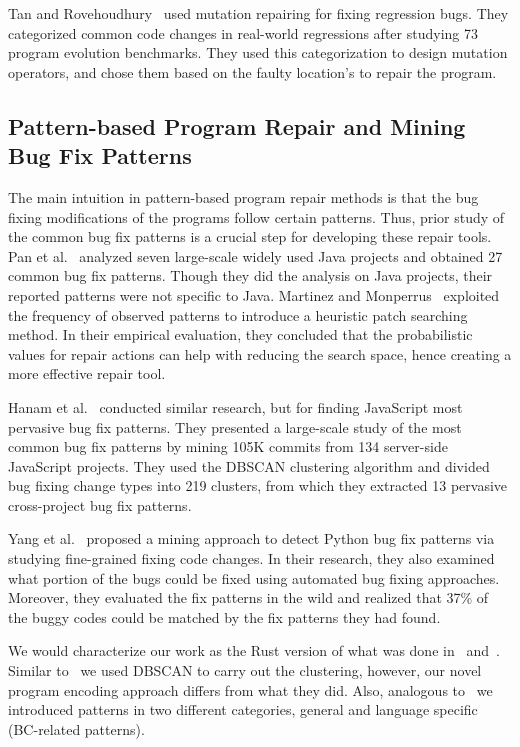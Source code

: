 Tan and Rovehoudhury~\cite{tan2015relifix} used mutation repairing for fixing regression bugs. They categorized common code changes in real-world regressions after studying 73 program evolution benchmarks. They used this categorization to design mutation operators, and chose them based on the faulty location’s to repair the program.

\subsection{Pattern-based Program Repair and Mining Bug Fix Patterns}

The main intuition in pattern-based program repair methods is that the bug fixing modifications of the programs follow certain patterns. Thus, prior study of the common bug fix patterns is a crucial step for developing these repair tools. Pan et al.~\cite{pan2009toward} analyzed seven large-scale widely used Java projects and obtained 27 common bug fix patterns. Though they did the analysis on Java projects, their reported patterns were not specific to Java. Martinez and Monperrus~\cite{martinez2015mining, martinez2012mining} exploited the frequency of observed patterns to introduce a heuristic patch searching method. In their empirical evaluation, they concluded that the probabilistic values for repair actions can help with reducing the search space, hence creating a more effective repair tool.

Hanam et al.~\cite{hanam2016discovering} conducted similar research, but for finding JavaScript most pervasive bug fix patterns. They presented a large-scale study of the most common bug fix patterns by mining 105K commits from 134 server-side JavaScript projects. They used the DBSCAN clustering algorithm and divided bug fixing change types into 219 clusters, from which they extracted 13 pervasive cross-project bug fix patterns. 

Yang et al.~\cite{yang2022mining} proposed a mining approach to detect Python bug fix patterns via studying fine-grained fixing code changes. In their research, they also examined what portion of the bugs could be fixed using automated bug fixing approaches. Moreover, they evaluated the fix patterns in the wild and realized that 37\% of the buggy codes could be matched by the fix patterns they had found. 

We would characterize our work as the Rust version of what was done in~\cite{hanam2016discovering} and~\cite{yang2022mining}. Similar to~\cite{hanam2016discovering} we used DBSCAN to carry out the clustering, however, our novel program encoding approach differs from what they did. Also, analogous to~\cite{yang2022mining} we introduced patterns in two different categories, general and language specific (BC-related patterns).

